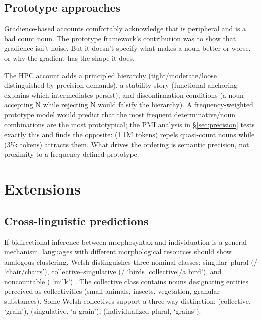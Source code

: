 \documentclass[12pt,a4paper]{article}
\begin{document}
\subsection{Prototype approaches}

Gradience-based accounts \citep{taylor2003} comfortably acknowledge that  is peripheral and  is a bad count noun. The prototype framework's contribution was to show that gradience isn't noise. But it doesn't specify what makes a noun better or worse, or why the gradient has the shape it does.

The HPC account adds a principled hierarchy (tight/moderate/loose distinguished by precision demands), a stability story (functional anchoring explains which intermediates persist), and disconfirmation conditions (a noun accepting  N while rejecting  N would falsify the hierarchy). A frequency-weighted prototype model would predict that the most frequent determinative/noun combinations are the most prototypical; the PMI analysis in \S\ref{sec:precision} tests exactly this and finds the opposite:  (1.1M tokens) repels quasi-count nouns while  (35k tokens) attracts them. What drives the ordering is semantic precision, not proximity to a frequency-defined prototype.

\section{Extensions}\label{sec:extensions}

\subsection{Cross-linguistic predictions}

If bidirectional inference between morphosyntax and individuation is a general mechanism, languages with different morphological resources should show analogous clustering. Welsh distinguishes three nominal classes: singular--plural (/ `chair/chairs'), collective--singulative (/ `birds [collective]/a bird'), and noncountable ( `milk') \citep[pp.~530--535]{grimm2018}. The collective class contains nouns designating entities perceived as collectivities (small animals, insects, vegetation, granular substances). Some Welsh collectives support a three-way distinction:  (collective, `grain'),  (singulative, `a grain'),  (individualized plural, `grains').
\end{document}
